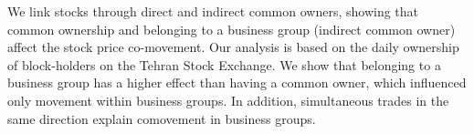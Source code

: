  We link stocks through direct and indirect common owners, showing that common ownership and belonging to a business group (indirect common owner) affect the stock price co-movement. Our analysis is based on the daily ownership of block-holders on the Tehran Stock Exchange. We show that belonging to a business group has a higher effect than having a common owner, which influenced only movement within business groups. In addition, simultaneous trades in the same direction explain comovement in business groups.
